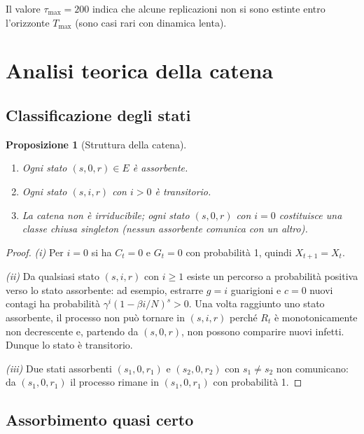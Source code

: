 \documentclass[11pt, a4paper]{article}
\theoremstyle{plain}
\newtheorem{proposition}[theorem]{Proposizione}
\theoremstyle{definition}
\theoremstyle{remark}
\begin{document}
Il valore $\tau_{\max} = 200$ indica che alcune replicazioni non si sono estinte
entro l'orizzonte $T_{\max}$ (sono casi rari con dinamica lenta).

\section{Analisi teorica della catena}
\label{sec:teoria}

\subsection{Classificazione degli stati}

\begin{proposition}[Struttura della catena]\label{prop:struttura}
  \begin{enumerate}[label=(\roman*)]
    \item Ogni stato $(s, 0, r) \in E$ è \emph{assorbente}.
    \item Ogni stato $(s, i, r)$ con $i > 0$ è \emph{transitorio}.
    \item La catena non è irriducibile; ogni stato $(s,0,r)$ con $i=0$ costituisce
          una classe chiusa singleton (nessun assorbente comunica con un altro).
  \end{enumerate}
\end{proposition}

\begin{proof}
  \emph{(i)} Per $i = 0$ si ha $C_t = 0$ e $G_t = 0$ con probabilità 1, quindi
  $X_{t+1} = X_t$.

  \emph{(ii)} Da qualsiasi stato $(s, i, r)$ con $i \geq 1$ esiste un percorso a
  probabilità positiva verso lo stato assorbente: ad esempio, estrarre $g = i$
  guarigioni e $c = 0$ nuovi contagi ha probabilità $\gamma^i (1-\beta i/N)^s > 0$.
  Una volta raggiunto uno stato assorbente, il processo non può tornare in $(s,i,r)$
  perché $R_t$ è monotonicamente non decrescente e, partendo da $(s,0,r)$, non
  possono comparire nuovi infetti. Dunque lo stato è transitorio.

  \emph{(iii)} Due stati assorbenti $(s_1, 0, r_1)$ e $(s_2, 0, r_2)$ con
  $s_1 \neq s_2$ non comunicano: da $(s_1, 0, r_1)$ il processo rimane in
  $(s_1, 0, r_1)$ con probabilità 1.
\end{proof}

\subsection{Assorbimento quasi certo}
\end{document}
